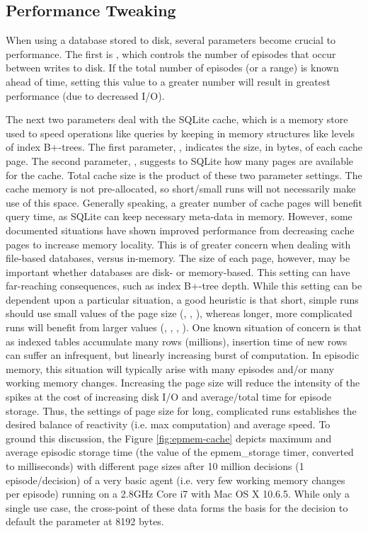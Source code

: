 \subsection{Performance Tweaking}
When using a database stored to disk, several parameters become crucial to performance.  
The first is , which controls the number of episodes that occur between writes to disk.  
If the total number of episodes (or a range) is known ahead of time, setting this value to a greater number will result in greatest performance (due to decreased I/O).

The next two parameters deal with the SQLite cache, which is a memory store used to speed operations like queries by keeping in memory structures like levels of index B+-trees. 
The first parameter, , indicates the size, in bytes, of each cache page. 
The second parameter, , suggests to SQLite how many pages are available for the cache. 
Total cache size is the product of these two parameter settings. 
The cache memory is not pre-allocated, so short/small runs will not necessarily make use of this space. 
Generally speaking, a greater number of cache pages will benefit query time, as SQLite can keep necessary meta-data in memory. 
However, some documented situations have shown improved performance from decreasing cache pages to increase memory locality. 
This is of greater concern when dealing with file-based databases, versus in-memory. 
The size of each page, however, may be important whether databases are disk- or memory-based. 
This setting can have far-reaching consequences, such as index B+-tree depth. 
While this setting can be dependent upon a particular situation, a good heuristic is that short, simple runs should use small values of the page size (, , ), whereas longer, more complicated runs will benefit from larger values (, , , ). 
One known situation of concern is that as indexed tables accumulate many rows (\tild millions), insertion time of new rows can suffer an infrequent, but linearly increasing burst of computation. 
In episodic memory, this situation will typically arise with many episodes and/or many working memory changes. 
Increasing the page size will reduce the intensity of the spikes at the cost of increasing disk I/O and average/total time for episode storage. 
Thus, the settings of page size for long, complicated runs establishes the desired balance of reactivity (i.e. max computation) and average speed. 
To ground this discussion, the Figure \ref{fig:epmem-cache} depicts maximum and average episodic storage time (the value of the epmem\_storage timer, converted to milliseconds) with different page sizes after 10 million decisions (1 episode/decision) of a very basic agent (i.e. very few working memory changes per episode) running on a 2.8GHz Core i7 with Mac OS X 10.6.5. 
While only a single use case, the cross-point of these data forms the basis for the decision to default the parameter at 8192 bytes.

